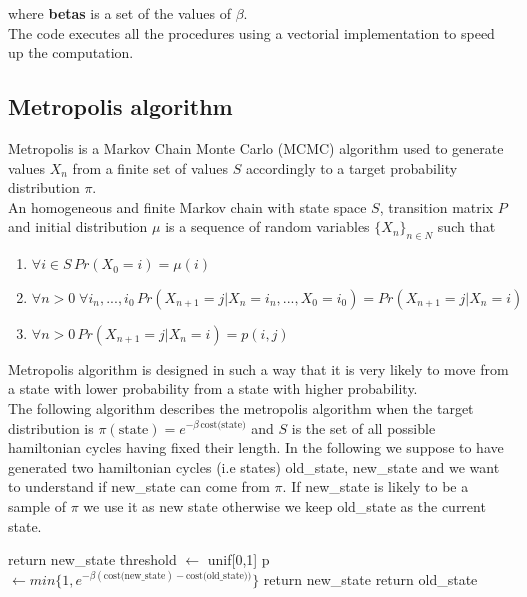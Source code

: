 \documentclass{article}
\begin{document}
\noindent where \textbf{betas} is a set of the values of $\beta$. \\ 
The code executes all the procedures using a vectorial implementation to speed up the computation.

\subsection{Metropolis algorithm}
Metropolis is a Markov Chain Monte Carlo (MCMC) algorithm used to generate values $X_n$ from a finite set of values $S$ accordingly to a target probability distribution $\pi$.  \\
An homogeneous and finite Markov chain with state space $S$, transition matrix $P$ and initial distribution $\mu$ is a sequence of random variables $\{ X_n \}_{n \in N}$ such that
\begin{enumerate}
\item $\forall i \in S \, Pr(X_0=i)= \mu(i)$ 
\item $\forall n > 0 \; \forall i_n,...,i_0 \,  Pr(X_{n+1} = j | X_n = i_n,..., X_0=i_0) = Pr(X_{n+1} = j | X_n = i)$
\item $\forall n > 0 \, Pr(X_{n+1} = j | X_n = i) = p(i,j) $
\end{enumerate}
Metropolis algorithm is designed in such a way that it is very likely to move from a state with lower probability from a state with higher probability. \\
The following algorithm describes the metropolis algorithm when the target distribution is $\pi(\text{state}) = e^{- \beta \, \text{cost(state)}}$ and $S$ is the set of all possible hamiltonian cycles having fixed their length. In the following we suppose to have generated two hamiltonian cycles (i.e states) old\_state, new\_state and we want to understand if new\_state can come from $\pi$. If new\_state is likely to be a sample of $\pi$ we use it as new state otherwise we keep old\_state as the current state.

\begin{algorithm}[H]
    \begin{algorithmic}[1]
      	\State return new\_state
      	\EndIf
        \State threshold $\leftarrow$ unif[0,1]
        \State p  $\leftarrow min\{1,e^{- \beta (\text{cost(new\_state}) - \text{cost(old\_state}))} \}$ 
        	\State return new\_state
        \Else
        	\State return old\_state
        \EndIf
       \EndFunction
\end{algorithmic}
\end{algorithm}
\noindent
\end{document}
